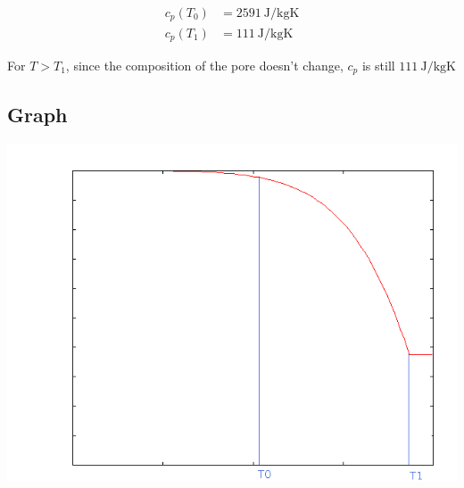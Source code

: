\documentclass{article}
\begin{document}
\begin{align*}
c_p(T_0) &= 2591 \mathrm{\ J/kgK} \\
c_p(T_1) &= 111 \mathrm{\ J/kgK}
\end{align*}

For $T > T_1$, since the composition of the pore doesn't change, $c_p$ is still $111 \mathrm{\ J/kgK}$

\subsection{Graph}

\includegraphics[width=\textwidth]{graphplot.png}
\end{document}
